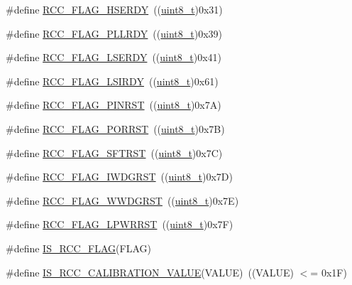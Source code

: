 \begin{DoxyCompactItemize}
\item 
\#define \hyperlink{group___r_c_c___flag_ga173edf47bec93cf269a0e8d0fec9997c}{R\+C\+C\+\_\+\+F\+L\+A\+G\+\_\+\+H\+S\+E\+R\+DY}~((\hyperlink{_p_e___types_8h_aba7bc1797add20fe3efdf37ced1182c5}{uint8\+\_\+t})0x31)
\item 
\#define \hyperlink{group___r_c_c___flag_gaf82d8afb18d9df75db1d6c08b9c50046}{R\+C\+C\+\_\+\+F\+L\+A\+G\+\_\+\+P\+L\+L\+R\+DY}~((\hyperlink{_p_e___types_8h_aba7bc1797add20fe3efdf37ced1182c5}{uint8\+\_\+t})0x39)
\item 
\#define \hyperlink{group___r_c_c___flag_gac9fb963db446c16e46a18908f7fe1927}{R\+C\+C\+\_\+\+F\+L\+A\+G\+\_\+\+L\+S\+E\+R\+DY}~((\hyperlink{_p_e___types_8h_aba7bc1797add20fe3efdf37ced1182c5}{uint8\+\_\+t})0x41)
\item 
\#define \hyperlink{group___r_c_c___flag_ga8c5e4992314d347597621bfe7ab10d72}{R\+C\+C\+\_\+\+F\+L\+A\+G\+\_\+\+L\+S\+I\+R\+DY}~((\hyperlink{_p_e___types_8h_aba7bc1797add20fe3efdf37ced1182c5}{uint8\+\_\+t})0x61)
\item 
\#define \hyperlink{group___r_c_c___flag_gabfc3ab5d4a8a94ec1c9f38794ce37ad6}{R\+C\+C\+\_\+\+F\+L\+A\+G\+\_\+\+P\+I\+N\+R\+ST}~((\hyperlink{_p_e___types_8h_aba7bc1797add20fe3efdf37ced1182c5}{uint8\+\_\+t})0x7\+A)
\item 
\#define \hyperlink{group___r_c_c___flag_ga39ad309070f416720207eece5da7dc2c}{R\+C\+C\+\_\+\+F\+L\+A\+G\+\_\+\+P\+O\+R\+R\+ST}~((\hyperlink{_p_e___types_8h_aba7bc1797add20fe3efdf37ced1182c5}{uint8\+\_\+t})0x7\+B)
\item 
\#define \hyperlink{group___r_c_c___flag_gaf7852615e9b19f0b2dbc8d08c7594b52}{R\+C\+C\+\_\+\+F\+L\+A\+G\+\_\+\+S\+F\+T\+R\+ST}~((\hyperlink{_p_e___types_8h_aba7bc1797add20fe3efdf37ced1182c5}{uint8\+\_\+t})0x7\+C)
\item 
\#define \hyperlink{group___r_c_c___flag_gaac46bac8a97cf16635ff7ffc1e6c657f}{R\+C\+C\+\_\+\+F\+L\+A\+G\+\_\+\+I\+W\+D\+G\+R\+ST}~((\hyperlink{_p_e___types_8h_aba7bc1797add20fe3efdf37ced1182c5}{uint8\+\_\+t})0x7\+D)
\item 
\#define \hyperlink{group___r_c_c___flag_gaa80b60b2d497ccd7b7de1075009999a7}{R\+C\+C\+\_\+\+F\+L\+A\+G\+\_\+\+W\+W\+D\+G\+R\+ST}~((\hyperlink{_p_e___types_8h_aba7bc1797add20fe3efdf37ced1182c5}{uint8\+\_\+t})0x7\+E)
\item 
\#define \hyperlink{group___r_c_c___flag_ga67049531354aed7546971163d02c9920}{R\+C\+C\+\_\+\+F\+L\+A\+G\+\_\+\+L\+P\+W\+R\+R\+ST}~((\hyperlink{_p_e___types_8h_aba7bc1797add20fe3efdf37ced1182c5}{uint8\+\_\+t})0x7\+F)
\item 
\#define \hyperlink{group___r_c_c___flag_gaa27dea5bb62b26d0881e649770252158}{I\+S\+\_\+\+R\+C\+C\+\_\+\+F\+L\+AG}(F\+L\+AG)
\item 
\#define \hyperlink{group___r_c_c___flag_gafda50a08dc048f7c272bf04ec9c2c2b7}{I\+S\+\_\+\+R\+C\+C\+\_\+\+C\+A\+L\+I\+B\+R\+A\+T\+I\+O\+N\+\_\+\+V\+A\+L\+UE}(V\+A\+L\+UE)~((V\+A\+L\+UE) $<$= 0x1\+F)
\end{DoxyCompactItemize}
